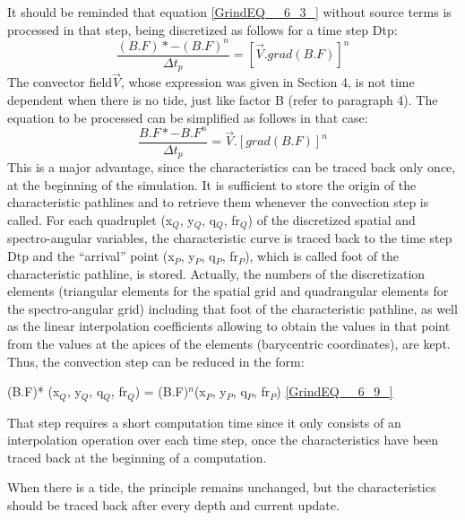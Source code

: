  It should be reminded that equation \eqref{GrindEQ__6_3_} without source terms is processed in that step, being discretized as follows for a time step Dtp:
\begin{equation} \label{GrindEQ__6_7_}
\frac{(B.F)*-(B.F)^{n} }{\Delta t_{p} } =\left[\vec{V}.grad(B.F)\right]^{n}
\end{equation}
The convector field$\vec{V}$, whose expression was given in Section 4, is not time dependent when there is no tide, just like factor B (refer to paragraph 4). The equation to be processed can be simplified as follows in that case:
\begin{equation} \label{GrindEQ__6_8_}
\frac{B.F*-B.F^{n} }{\Delta t_{p} } =\vec{V}.\left[grad(B.F)\right]^{n}
\end{equation}
This is a major advantage, since the characteristics can be traced back only once, at the beginning of the simulation. It is sufficient to store the origin of the characteristic pathlines and to retrieve them whenever the convection step is called. For each quadruplet (x${}_{Q}$, y${}_{Q}$, q${}_{Q}$, fr${}_{Q}$) of the discretized spatial and spectro-angular variables, the characteristic curve is traced back to the time step Dtp and the ``arrival'' point (x${}_{P}$, y${}_{P}$, q${}_{P}$, fr${}_{P}$), which is called foot of the characteristic pathline, is stored. Actually, the numbers of the discretization elements (triangular elements for the spatial grid and quadrangular elements for the spectro-angular grid) including that foot of the characteristic pathline, as well as the linear interpolation coefficients allowing to obtain the values in that point from the values at the apices of the elements (barycentric coordinates), are kept. Thus, the convection step can be reduced in the form:

(B.F)* (x${}_{Q}$, y${}_{Q}$, q${}_{Q}$, fr${}_{Q}$) = (B.F)${}^{n}$(x${}_{P}$, y${}_{P}$, q${}_{P}$, fr${}_{P}$) \eqref{GrindEQ__6_9_}

That step requires a short computation time since it only consists of an interpolation operation over each time step, once the characteristics have been traced back at the beginning of a computation.

 When there is a tide, the principle remains unchanged, but the characteristics should be traced back after every depth and current update.

